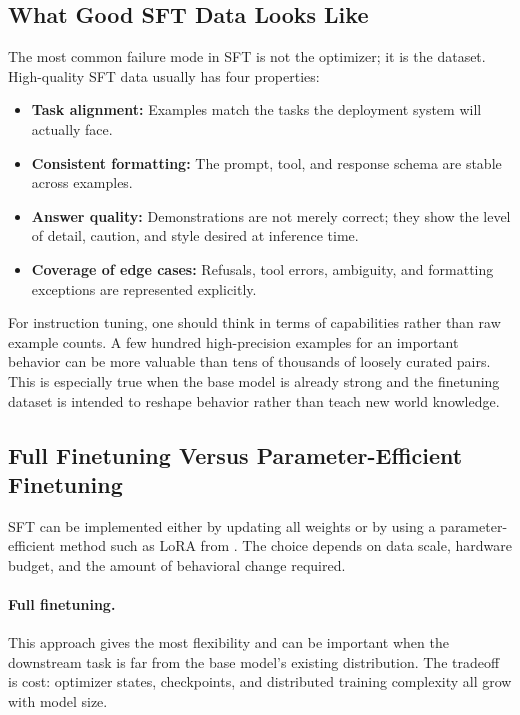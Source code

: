 \documentclass[class=article,crop=false]{standalone}
\begin{document}
\subsection{What Good SFT Data Looks Like}
\label{sec:sft:data}

The most common failure mode in SFT is not the optimizer; it is the dataset. High-quality SFT data usually has four properties:
\begin{itemize}
  \item \textbf{Task alignment:} Examples match the tasks the deployment system will actually face.
  \item \textbf{Consistent formatting:} The prompt, tool, and response schema are stable across examples.
  \item \textbf{Answer quality:} Demonstrations are not merely correct; they show the level of detail, caution, and style desired at inference time.
  \item \textbf{Coverage of edge cases:} Refusals, tool errors, ambiguity, and formatting exceptions are represented explicitly.
\end{itemize}

For instruction tuning, one should think in terms of capabilities rather than raw example counts. A few hundred high-precision examples for an important behavior can be more valuable than tens of thousands of loosely curated pairs. This is especially true when the base model is already strong and the finetuning dataset is intended to reshape behavior rather than teach new world knowledge.

\subsection{Full Finetuning Versus Parameter-Efficient Finetuning}
\label{sec:sft:peft}

SFT can be implemented either by updating all weights or by using a parameter-efficient method such as LoRA from . The choice depends on data scale, hardware budget, and the amount of behavioral change required.

\paragraph{Full finetuning.}
This approach gives the most flexibility and can be important when the downstream task is far from the base model's existing distribution. The tradeoff is cost: optimizer states, checkpoints, and distributed training complexity all grow with model size.
\end{document}
